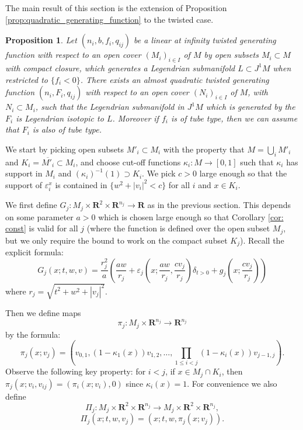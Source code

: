 \documentclass[reqno]{amsart}
\renewcommand{\epsilon}{\varepsilon}
\theoremstyle{theorem}
\newtheorem{proposition}[corollary]{Proposition}
\theoremstyle{remark}
\theoremstyle{definition}
\newcommand{\R}{\mathbf{R}}
\begin{document}
The main result of this section is the extension of Proposition \ref{prop:quadratic_generating_function} to the twisted case.
\begin{proposition}\label{prop:linear_to_quadratic_twisted}
Let $(n_i,b,f_i,q_{ij})$ be a linear at infinity twisted generating function
with respect to an open cover $(M_i)_{i\in I}$ of $M$ by open subsets $M_i \subset M$ with compact closure, which generates
a Legendrian submanifold $L \subset J^1M$ when restricted to $\{f_i<0\}$.
There exists an almost quadratic twisted generating function $(n_i,F_i,q_{ij})$
with respect to an open cover $(N_i)_{i\in I}$ of $M$, with $N_i \subset M_i$, such that the Legendrian submanifold in $J^1M$ which is
generated by the $F_i$ is Legendrian isotopic to $L$. Moreover if $f_i$ is of tube type, then
we can assume that $F_i$ is also of tube type.
\end{proposition}






We start by picking open subsets $M'_i \subset M_i$ with the property that $M=\bigcup_i M'_i$ and $K_i=\overline{M'_i} \subset M_i$,
 and choose cut-off functions $\kappa_i : M\to [0,1]$ such that $\kappa_i$ has support in $M_i$ and
$(\kappa_i)^{-1}(1) \supset K_i$.  We pick $c>0$ large enough so that the support of $\epsilon^x_i$
is contained in $\{w^2+|v_i|^2 < c\}$ for all $i$ and $x\in K_i$.


We first define $G_j : M_j \times \R^2\times \R^{n_j}\to \R$ as in the previous section. This depends on some parameter $a>0$
which is chosen large enough so that Corollary \ref{cor: const} is valid for all $j$ (where the function is defined over the open subset $M_j$, but we only require the bound to work on the compact subset $K_j$).
Recall the explicit formula:
\[G_j(x;t,w,v)= \frac{r_j^2}{a}\left(\frac{aw}{r_j}+\epsilon_j\left(x;\frac{aw}{r_j},\frac{cv_j}{r_j}\right)\delta_{t>0} + g_j\left(x;\frac{cv_j}{r_j}\right)\right) \]
where $r_j=\sqrt{t^2+w^2+|v_j|^2}$.


Then we define maps 
\[\pi_j:M_j \times \R^{n_j}\to \R^{n_j}\]
by the formula:
\[\pi_j(x;v_j)=(v_{0,1},(1-\kappa_1(x))v_{1,2},\dots, \prod_{1 \leq i <  j}(1-\kappa_i(x))v_{j-1,j}).\]
Observe the following key property: for $i<j$, if $x\in M_j \cap K_i$, then $\pi_j(x;v_i,v_{ij})=(\pi_i(x;v_i),0)$ since $\kappa_i(x)=1$.
For convenience we also define
\[\Pi_j:M_j \times \R^2\times \R^{n_j} \to M_j \times \R^2\times \R^{n_j},\]
\[\Pi_j(x;t,w,v_j)=(x;t,w,\pi_j(x;v_j)).\]
\end{document}
